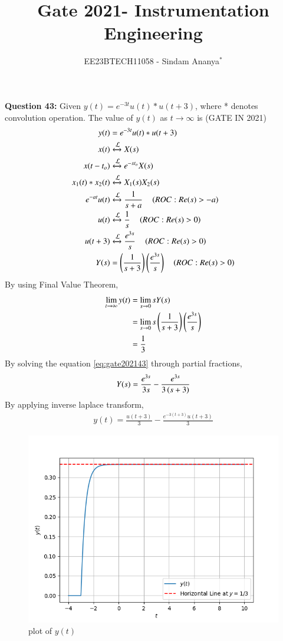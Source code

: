 \documentclass[journal,12pt,twocolumn]{IEEEtran}
\theoremstyle{remark}
\begin{document}

\vspace{3cm}

\title{Gate 2021- Instrumentation Engineering}
\author{EE23BTECH11058 - Sindam Ananya$^{*}$%
}
\maketitle
\newpage
\bigskip

\renewcommand{\thefigure}{\theenumi}
\renewcommand{\thetable}{\theenumi}

\vspace{3cm}
\textbf{Question 43:} 
Given $y(t) = e^{-3t}u(t) * u(t+3)$, where * denotes convolution operation. The value of $y(t)$ as $t \rightarrow \infty$ is
\hfill{(GATE IN 2021)}\\
\solution
\begin{align}
y(t) &=  e^{-3t}u(t) * u(t+3)\\
x(t) &\xleftrightarrow{\mathcal{L}} X(s)\\
x(t-t_o) &\xleftrightarrow{\mathcal{L}} e^{-s t_o}X(s)\\
x_1(t) * x_2(t) &\xleftrightarrow{\mathcal{L}} X_1(s)X_2(s)\\
e^{-at}u(t) &\xleftrightarrow{\mathcal{L}} \frac{1}{s + a} \quad \left(ROC:Re(s)>-a\right)\\
u(t) &\xleftrightarrow{\mathcal{L}} \frac{1}{s} \quad \left(ROC:Re(s)>0\right)\\
u(t+3) &\xleftrightarrow{\mathcal{L}} \frac{e^{3s}}{s} \quad \left(ROC:Re(s)>0\right)\\ 
Y(s) &= \left(\frac{1}{s + 3}\right)\left(\frac{e^{3s}}{s}\right) \quad \left(ROC:Re(s)>0\right)
\label{eq:gate202143}
\end{align}
By using Final Value Theorem,
\begin{align}
\lim\limits_{t \to \infty} y(t) &= \lim\limits_{s \to 0} sY(s)\\
                                &= \lim\limits_{s \to 0} s\left(\frac{1}{s + 3}\right)\left(\frac{e^{3s}}{s}\right)\\
                                &= \frac{1}{3}
\end{align}
By solving the equation \eqref{eq:gate202143} through partial fractions,
\begin{align}
Y(s) = \frac{e^{3s}}{3s} - \frac{e^{3s}}{3\left(s+3\right)} 
\end{align}
By applying inverse laplace transform,
\begin{align}
y(t) = \frac{u(t+3)}{3} - \frac{e^{-3(t+3)}u(t+3)}{3}
\end{align}
\begin{figure}[h!]
    \centering
    \includegraphics[width=0.8\columnwidth]{figs/plot.png}
    \caption{plot of $y(t)$}
    \label{fig:gate202138fig}
\end{figure}
\end{document}
